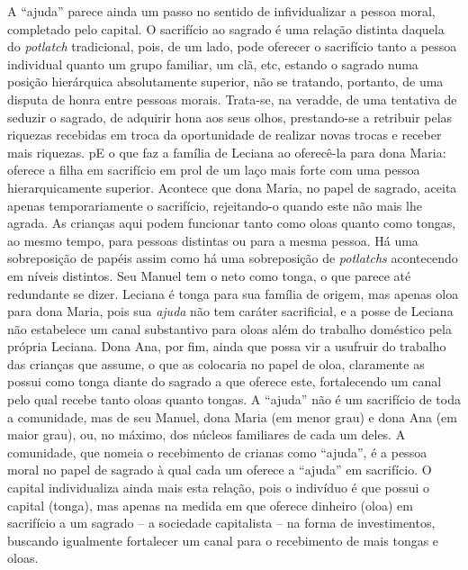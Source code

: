 A \enquote{ajuda} parece ainda um passo no sentido de infividualizar a pessoa moral, completado pelo capital.
O sacrifício ao sagrado é uma relação distinta daquela do \textit{potlatch} tradicional, pois, de um lado, pode oferecer o sacrifício tanto a pessoa individual quanto um grupo familiar, um clã, etc, estando o sagrado numa posição hierárquica absolutamente superior, não se tratando, portanto, de uma disputa de honra entre pessoas morais.
Trata-se, na veradde, de uma tentativa de seduzir o sagrado, de adquirir hona aos seus olhos, prestando-se a retribuir pelas riquezas recebidas em troca da oportunidade de realizar novas trocas e receber mais riquezas.
pE o que faz a família de Leciana ao oferecê-la para dona Maria:
oferece a filha em sacrifício em prol de um laço mais forte com uma pessoa hierarquicamente superior.
Acontece que dona Maria, no papel de sagrado, aceita apenas temporariamente o sacrifício, rejeitando-o quando este não mais lhe agrada.
As crianças aqui podem funcionar tanto como oloas quanto como tongas, ao mesmo tempo, para pessoas distintas ou para a mesma pessoa.
Há uma sobreposição de papéis assim como há uma sobreposição de \textit{potlatchs} acontecendo em níveis distintos.
Seu Manuel tem o neto como tonga, o que parece até redundante se dizer.
Leciana é tonga para sua família de origem, mas apenas oloa para dona Maria, pois sua \textit{ajuda} não tem caráter sacrificial, e a posse de Leciana não estabelece um canal substantivo para oloas além do trabalho doméstico pela própria Leciana.
Dona Ana, por fim, ainda que possa vir a usufruir do trabalho das crianças que assume, o que as colocaria no papel de oloa, claramente as possui como tonga diante do sagrado a que oferece este, fortalecendo um canal pelo qual recebe tanto oloas quanto tongas.
A \enquote{ajuda} não é um sacrifício de toda a comunidade, mas de seu Manuel, dona Maria (em menor grau) e dona Ana (em maior grau), ou, no máximo, dos núcleos familiares de cada um deles.
A comunidade, que nomeia o recebimento de crianas como \enquote{ajuda}, é a pessoa moral no papel de sagrado à qual cada um oferece a \enquote{ajuda} em sacrifício. O capital individualiza ainda mais esta relação, pois o indivíduo é que possui o capital (tonga), mas apenas na medida em que oferece dinheiro (oloa) em sacrifício a um sagrado -- a sociedade capitalista -- na forma de investimentos, buscando igualmente fortalecer um canal para o recebimento de mais tongas e oloas.